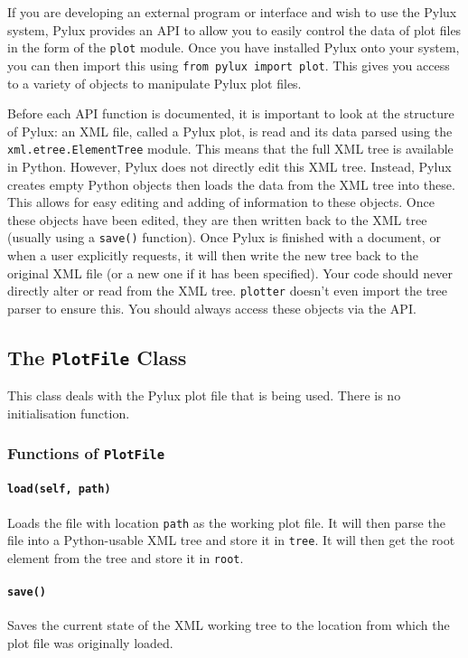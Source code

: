 \documentclass[a4paper]{article}
\begin{document}
If you are developing an external program or interface and wish to use the 
Pylux system, Pylux provides an API to allow you to easily control the data of 
plot files in the form of the \texttt{plot} module. Once you have installed 
Pylux onto your system, you can then import this using 
\texttt{from pylux import plot}. This gives you access to a variety of 
objects to manipulate Pylux plot files.

Before each API function is documented, it is important to look at the 
structure of Pylux: an XML file, called a Pylux plot, is read and its data 
parsed using the \texttt{xml.etree.ElementTree} module. This means that the 
full XML tree is available in Python. However, Pylux does not directly edit 
this XML tree. Instead, Pylux creates empty Python objects then loads the 
data from the XML tree into these. This allows for easy editing and adding of 
information to these objects. Once these objects have been edited, they are 
then written back to the XML tree (usually using a \texttt{save()} function). 
Once Pylux is finished with a document, or when a user explicitly requests, 
it will then write the new tree back to the original XML file (or a new one if 
it has been specified). Your code should never directly alter or read from 
the XML tree. \texttt{plotter} doesn't even import the tree parser to ensure 
this. You should always access these objects via the API.

\subsection{The \texttt{PlotFile} Class}
This class deals with the Pylux plot file that is being used. There is no 
initialisation function.

\subsubsection{Functions of \texttt{PlotFile}}

\paragraph{\texttt{load(self, path)}}
Loads the file with location \texttt{path} as the working plot file. It will 
then parse the file into a Python-usable XML tree and store it in 
\texttt{tree}. It will then get the root element from the tree and store it in 
\texttt{root}.

\paragraph{\texttt{save()}}
Saves the current state of the XML working tree to the location from which 
the plot file was originally loaded.
\end{document}
